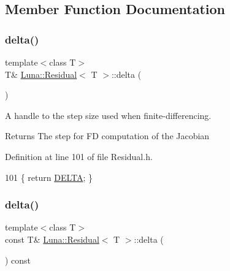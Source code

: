 \subsection{Member Function Documentation}
\mbox{\label{classLuna_1_1Residual_a77c3f160a7683b9c960e5b3192107ae9}} 
\subsubsection{\texorpdfstring{delta()}{delta()}\hspace{0.1cm}{\footnotesize\ttfamily [1/2]}}
{\footnotesize\ttfamily template$<$class T$>$ \\
T\& \hyperlink{classLuna_1_1Residual}{Luna\+::\+Residual}$<$ T $>$\+::delta (\begin{DoxyParamCaption}{ }\end{DoxyParamCaption})\hspace{0.3cm}{\ttfamily [inline]}}



A handle to the step size used when finite-\/differencing. 

\begin{DoxyReturn}{Returns}
The step for FD computation of the Jacobian 
\end{DoxyReturn}


Definition at line 101 of file Residual.\+h.


\begin{DoxyCode}
101 \{ \textcolor{keywordflow}{return} \hyperlink{classLuna_1_1Residual_a1bf38ddfa149797de560dcb11c975fef}{DELTA}; \}
\end{DoxyCode}
\mbox{\label{classLuna_1_1Residual_a61c46d8d03274f949b2ac0832c30bde4}} 
\subsubsection{\texorpdfstring{delta()}{delta()}\hspace{0.1cm}{\footnotesize\ttfamily [2/2]}}
{\footnotesize\ttfamily template$<$class T$>$ \\
const T\& \hyperlink{classLuna_1_1Residual}{Luna\+::\+Residual}$<$ T $>$\+::delta (\begin{DoxyParamCaption}{ }\end{DoxyParamCaption}) const\hspace{0.3cm}{\ttfamily [inline]}}



